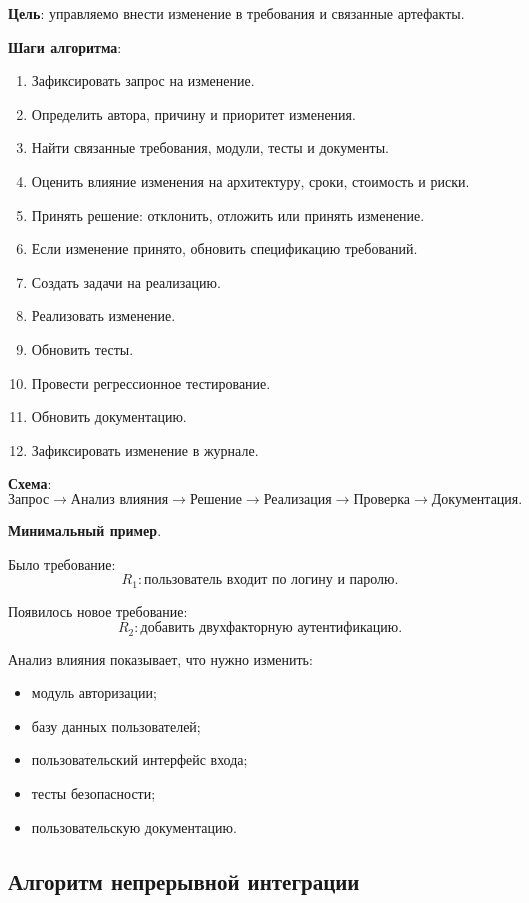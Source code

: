 \documentclass[12pt,a4paper]{article}
\begin{document}
\textbf{Цель}: управляемо внести изменение в требования и связанные артефакты.

\textbf{Шаги алгоритма}:
\begin{enumerate}
    \item Зафиксировать запрос на изменение.
    \item Определить автора, причину и приоритет изменения.
    \item Найти связанные требования, модули, тесты и документы.
    \item Оценить влияние изменения на архитектуру, сроки, стоимость и риски.
    \item Принять решение: отклонить, отложить или принять изменение.
    \item Если изменение принято, обновить спецификацию требований.
    \item Создать задачи на реализацию.
    \item Реализовать изменение.
    \item Обновить тесты.
    \item Провести регрессионное тестирование.
    \item Обновить документацию.
    \item Зафиксировать изменение в журнале.
\end{enumerate}

\textbf{Схема}:
\[
\text{Запрос}
\rightarrow
\text{Анализ влияния}
\rightarrow
\text{Решение}
\rightarrow
\text{Реализация}
\rightarrow
\text{Проверка}
\rightarrow
\text{Документация}.
\]

\textbf{Минимальный пример}.

Было требование:
\[
R_1: \text{пользователь входит по логину и паролю}.
\]

Появилось новое требование:
\[
R_2: \text{добавить двухфакторную аутентификацию}.
\]

Анализ влияния показывает, что нужно изменить:
\begin{itemize}
    \item модуль авторизации;
    \item базу данных пользователей;
    \item пользовательский интерфейс входа;
    \item тесты безопасности;
    \item пользовательскую документацию.
\end{itemize}

\subsection{Алгоритм непрерывной интеграции}
\end{document}
